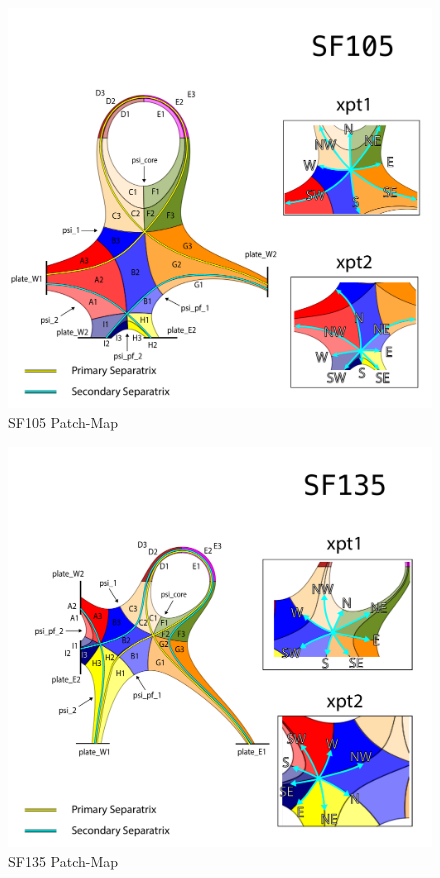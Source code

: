 \begin{figure}[H]
    \centering
        \includegraphics[width=\textwidth]{figures/configurations/SF105_collection.pdf}
        \caption{SF105 Patch-Map}
        \label{fig:sf105_patch_map}
\end{figure}
\begin{figure}[H]
    \centering
        \includegraphics[width=1.05\textwidth]{figures/configurations/SF135_collection.pdf}
        \caption{SF135 Patch-Map}
        \label{fig:sf135_patch_map}
\end{figure}
